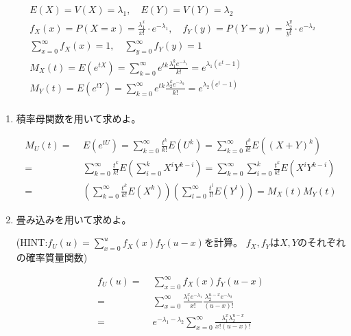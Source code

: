 \documentclass[12pt,b5paper]{ltjsarticle}
\begin{document}
\begin{enumerate}
      \begin{gather}
       E(X)=V(X)=\lambda_{1},\quad E(Y)=V(Y)=\lambda_{2}\\
       f_{X}(x)=P(X=x)=\frac{\lambda_{1}^{x}}{x!}\cdot e^{-\lambda_{1}}
       ,\quad f_{Y}(y)=P(Y=y)=\frac{\lambda_{2}^{y}}{y!}\cdot e^{-\lambda_{2}}\\
       \sum_{x=0}^{\infty}f_{X}(x)=1,\quad \sum_{y=0}^{\infty}f_{Y}(y)=1\\
       M_{X}(t)=E(e^{tX})
       =\sum_{k=0}^{\infty}e^{tk}\frac{\lambda_{1}^{k}e^{-\lambda_{1}}}{k!}
       =e^{\lambda_{1}(e^{t}-1)}\\
       M_{Y}(t)=E(e^{tY})
       =\sum_{k=0}^{\infty}e^{tk}\frac{\lambda_{2}^{k}e^{-\lambda_{2}}}{k!}
       =e^{\lambda_{2}(e^{t}-1)}\\
      \end{gather}

      \hrulefill

      \begin{enumerate}
       \item
            積率母関数を用いて求めよ。

            \dotfill

            \begin{align}
             M_{U}(t)
             =&\; E(e^{tU})
             = \sum_{k=0}^{\infty} \frac{t^{k}}{k!} E(U^{k})
             = \sum_{k=0}^{\infty} \frac{t^{k}}{k!} E((X+Y)^{k})\\
             =&\; \sum_{k=0}^{\infty} \frac{t^{k}}{k!} E\left(\sum_{i=0}^{k}X^{i}Y^{k-i}\right)
             = \sum_{k=0}^{\infty} \sum_{i=0}^{k} \frac{t^{k}}{k!} E(X^{i}Y^{k-i})\\
             =&\; \left(\sum_{k=0}^{\infty} \frac{t^{k}}{k!} E(X^{k})\right)
             \left(\sum_{l=0}^{\infty} \frac{t^{l}}{l!} E(Y^{l})\right)
             = M_{X}(t) M_{Y}(t)
            \end{align}

            \hrulefill

       \item
            畳み込みを用いて求めよ。

            (HINT:$f_{U}(u)=\sum_{x=0}^{u} f_{X}(x)f_{Y}(u-x)$を計算。
            $f_{X},f_{Y}$は$X,Y$のそれぞれの確率質量関数)

            \dotfill

            \begin{align}
             f_{U}(u)
             =&\; \sum_{x=0}^{\infty} f_{X}(x) f_{Y}(u-x)\\
             =&\; \sum_{x=0}^{\infty}
             \frac{\lambda_{1}^{x}e^{-\lambda_{1}}}{x!}
             \frac{\lambda_{2}^{u-x}e^{-\lambda_{2}}}{(u-x)!}\\
             =&\; e^{-\lambda_{1}-\lambda_{2}}
             \sum_{x=0}^{\infty} \frac{\lambda_{1}^{x} \lambda_{2}^{u-x}}{x!(u-x)!}\\
            \end{align}




\end{enumerate}
\end{enumerate}
\end{document}
